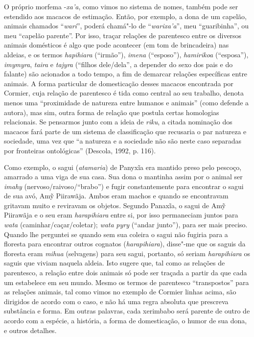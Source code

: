 O próprio morfema -\emph{xa'a}, como vimos no sistema de nomes, também
pode ser estendido aos macacos de estimação. Então, por exemplo, a dona
de um capelão, animais chamados ``\emph{wari}'', poderá chamá"-lo de
``\emph{warixa'a}'', meu ``guaribinha'', ou meu ``capelão parente''. Por
isso, traçar relações de parentesco entre os diversos animais domésticos
é algo que pode acontecer (em tom de brincadeira) nas aldeias, e os
termos \emph{hapihiara} (``irmão''), \emph{imena} (``esposo''),
\emph{hamirikoa} (``esposa''), \emph{imymyra}, \emph{taira} e
\emph{tajyra} (``filhos dele/dela'', a depender do sexo dos pais e do
falante) são acionados a todo tempo, a fim de demarcar relações
específicas entre animais. A forma particular de domesticação desses
macacos encontrada por Cormier, cuja relação de parentesco é tida como
central ao seu trabalho, denota menos uma ``proximidade de natureza entre
humanos e animais'' (como defende a autora), mas sim, outra forma de
relação que postula certas homologias relacionais. Se pensarmos junto
com a ideia de \emph{riku}, a citada nominação dos macacos fará parte de
um sistema de classificação que recusaria o par natureza e sociedade,
uma vez que ``a natureza e a sociedade não são neste caso separadas por
fronteiras ontológicas'' (Descola, 1992, p. 116).

Como exemplo, o sagui (\emph{atamaria}) de Panyxĩa era mantido preso
pelo pescoço, amarrado a uma viga de sua casa. Sua dona o mantinha assim
por o animal ser \emph{imahy} (nervoso/raivoso/``brabo'') e fugir
constantemente para encontrar o sagui de sua avó, Amỹ Piirawãja. Ambos
eram machos e quando se encontravam gritavam muito e reviravam os
objetos. Segundo Panaxĩa, o sagui de Amỹ Piirawãja e o seu eram
\emph{harapihiara} entre si, por isso permaneciam juntos para
\emph{wata} (caminhar/caçar/coletar); \emph{wata} \emph{pyry} (``andar
junto''), para ser mais preciso. Quando lhe perguntei se quando sem sua
coleira o sagui não fugiria para a floresta para encontrar outros
cognatos (\emph{harapihiara}), disse"-me que os saguis da floresta eram
\emph{mihua} (selvagens) para seu sagui, portanto, só seriam
\emph{harapihiara} os saguis que viviam naquela aldeia. Isto sugere que,
tal como as relações de parentesco, a relação entre dois animais só pode
ser traçada a partir da que cada um estabelece em seu mundo. Mesmo os
termos de parentesco ``transpostos'' para as relações animais, tal como
vimos no exemplo de Cormier linhas acima, são dirigidos de acordo com o
caso, e não há uma regra absoluta que prescreva substância e forma. Em
outras palavras, cada xerimbabo será parente de outro de acordo com a
espécie, a história, a forma de domesticação, o humor de sua dona, e
outros detalhes.

